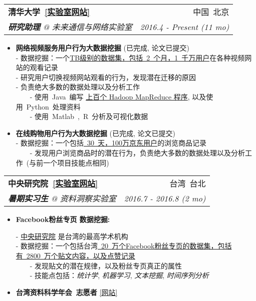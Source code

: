 \documentclass[letterpaper,11pt]{article}
\makeatletter
\newcommand{\resumeItem}[2]{
  \item\small{
    \textbf{#1}{ #2 \vspace{-2pt}}
  }
}
\newcommand{\resumeSubheading}[4]{
  \vspace{-1pt}\item
    \begin{tabular*}{0.97\textwidth}{l@{\extracolsep{\fill}}r}
      \textbf{#1} & #2 \\
      \textit{\small#3} & \textit{\small #4} \\
    \end{tabular*}\vspace{-5pt}
}
\newcommand{\resumeItemListStart}{\begin{itemize}}
\newcommand{\resumeItemListEnd}{\end{itemize}\vspace{-5pt}}
\makeatother
\begin{document}
\begin{CJK*}{UTF8}{gbsn}
    \resumeSubheading
      {清华大学~\color{blue}\href{http://fi.ee.tsinghua.edu.cn}{[实验室网站]}}{中国~北京}
      {\textbf{研究助理} @ 未来通信与网络实验室}{2016.4 - Present (11 mo)}
      \resumeItemListStart

        \resumeItem{网络视频服务用户行为大数据挖掘}{(已完成, 论文已提交)}\\
        \vspace{1mm}
          {- 数据挖掘：一个\underline{TB级别的数据集，包括~2~个月，1~千万用户}在各种视频网站的观看记录}\\
          {- 研究用户切换视频网站观看的行为，发现潜在迁移的原因}\\
          {- 负责绝大多数的数据处理以及分析工作} \\
          {~~~~- 使用~Java~编写 \underline{上百个 Hadoop MapReduce 程序}, 以及使用~Python~处理资料}\\
          {~~~~- 使用~Matlab~,~R~分析及可视化数据}\\

        \resumeItem{在线购物用户行为大数据挖掘}{(已完成, 论文已提交)}\\
        \vspace{1mm}
          {- 数据挖掘：一个包括\underline{~30~天，100万京东用户}的浏览商品记录}\\
          {~~~~- 发现用户浏览商品时的潜在行为，负责绝大多数的数据处理以及分析工作~(与前一个项目技能点相同)}\\
      \resumeItemListEnd
  
    \resumeSubheading
      {中央研究院~\color{blue}\href{http://mmnet.iis.sinica.edu.tw}{[实验室网站]}}{台湾~台北}
      {\textbf{暑期实习生} @ 资料洞察实验室}{2016.7 - 2016.8 (2 mo)}
      \resumeItemListStart
        \resumeItem{Facebook粉丝专页 数据挖掘: }\\
        \vspace{1mm}
          {- \href{https://www.sinica.edu.tw/ch}{中央研究院} 是台湾的最高学术机构}\\
          {- 数据挖掘：一个包括台湾\underline{~20~万个Facebook粉丝专页的数据集，包括有~2800~万个贴文内容，以及点赞记录}}\\
          {~~~~- 发现贴文的潜在规律，以及粉丝专页真正的属性}\\
          {~~~~- 技能点包括：\emph{统计学}, \emph{机器学习}, \emph{文本挖掘}, \emph{时间序列分析}}
        \resumeItem{台湾资料科学年会~志愿者} {\color{blue}\href{http://www.datasci.tw}{[网站]}} \\
      \resumeItemListEnd


\end{CJK*}
\end{document}
